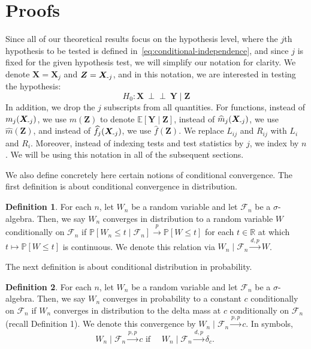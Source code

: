 \documentclass[12pt]{article}
\theoremstyle{definition}
\newtheorem{definition}{Definition}
\theoremstyle{remark}
\newcommand{\E}{\mathbb E}								%
\newcommand{\independent}{{\ \perp \! \! \! \perp\ }}	%
\newcommand{\prx}{\bm X}								%
\newcommand{\prz}{\bm Z}								%
\newcommand{\pry}{{\bm Y}}								%
\newcommand{\minus}{\textnormal{-}} 						    %
\begin{document}
\appendix

\section{Proofs}
Since all of our theoretical results focus on the hypothesis level, where the $j$th hypothesis to be tested is defined in~\eqref{eq:conditional-independence}, and since $j$ is fixed for the given hypothesis test, we will simplify our notation for clarity. We denote $\prx = \prx_j$ and $\prz = \prx_{\minus j}$, and in this notation, we are interested in testing the hypothesis:
\begin{equation}
	H_0: \prx \independent \pry \mid \prz
\end{equation}
In addition, we drop the $j$ subscripts from all quantities. For functions, instead of $m_j(\prx_{\minus j})$, we use $m(\prz)$ to denote $\E [\pry \mid \prz]$, instead of $\widehat m_j(\prx_{\minus j})$, we use $\widehat m(\prz)$, and instead of $\widehat f_j(\prx_{\minus j})$, we use $\widehat f(\prz)$. We replace $L_{ij}$ and $R_{ij}$ with $L_i$ and $R_i$. Moreover, instead of indexing tests and test statistics by $j$, we index by $n$. We will be using this notation in all of the subsequent sections.

We also define concretely here certain notions of conditional convergence. The first definition is about conditional convergence in distribution.

\begin{definition}
	\label{defn:d-p-convg}
	 For each $n$, let $W_n$ be a random variable and let $\mathcal{F}_n$ be a $\sigma$-algebra. Then, we say $W_n$ converges in distribution to a random variable $W$ conditionally on $\mathcal{F}_n$ if
	$\mathbb{P}\left[W_n \leq t \mid \mathcal{F}_n\right] \xrightarrow{p} \mathbb{P}[W \leq t]$ for each $t \in \mathbb{R}$ at which $t \mapsto \mathbb{P}[W \leq t]$ is continuous.
	We denote this relation via $W_n \mid \mathcal{F}_n \xrightarrow{d, p} W$.
\end{definition}

The next definition is about conditional distribution in probability.

\begin{definition}
		\label{defn:p-p-convg}
	For each $n$, let $W_n$ be a random variable and let $\mathcal{F}_n$ be a $\sigma$-algebra. Then, we say $W_n$ converges in probability to a constant $c$ conditionally on $\mathcal{F}_n$ if $W_n$ converges in distribution to the delta mass at $c$ conditionally on $\mathcal{F}_n$ (recall Definition 1). We denote this convergence by $W_n \mid \mathcal{F}_n \xrightarrow{p, p} c$. In symbols,
	$$
	W_n \mid \mathcal{F}_n \xrightarrow{p, p} c \text { if } \quad W_n \mid \mathcal{F}_n \xrightarrow{d, p} \delta_c \text {. }
	$$
\end{definition}
\end{document}
